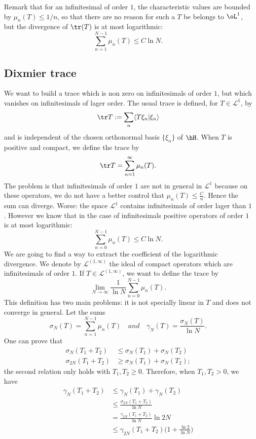 Remark that for an infinitesimal of order $1$, the characteristic values are bounded by $\mu_n(T)\leq 1/n$, so that there are no reason for such a $T$ be belongs to $\oL^1$, but the divergence of $\tr(T)$ is at most logarithmic:
\[
  \sum_{n=1}^{N-1}\mu_n(T)\leq C\ln N.
\]

\subsection{Dixmier trace}

We want to build a trace which is non zero on infinitesimals of order $1$, but which vanishes on infinitesimals of lager order. The usual trace is defined, for $T\in\mathscr{L}^{1}$,  by
\[
  \tr T:=\sum_n\langle T\xi_n|\xi_n\rangle
\]
and is independent of the chosen orthonormal basis $\{ \xi_n \}$ of $\hH$. When $T$ is positive and compact, we define the trace by
\[
  \tr T=\sum_{n=1}^{\infty}\mu_n(T).
\]
The problem is that infinitesimals of order $1$ are not in general in $\mathscr{L}^{1}$ because on these operators, we do not have a better control that $\mu_n(T)\leq \frac{ C }{ n }$. Hence the sum can diverge. Worse: the space $\mathscr{L}^{1}$ contains infinitesimals of order lager than $1$. However we know that in the case of infinitesimals positive operators of order $1$ is at most logarithmic:
\[
  \sum_{n=0}^{N-1}\mu_n(T)\leq C\ln N.
\]
We are going to find a way to extract the coefficient of the logarithmic divergence. We denote by $\mathscr{L}^{(1,\infty)}$ the ideal of compact operators which are infinitesimals of order $1$. If $T\in\mathscr{L}^{(1,\infty)}$, we want to define the trace by
\[
  \lim_{N\to\infty}\frac{1}{ \ln N }\sum_{n=0}^{N-1}\mu_n(T).
\]
This definition has two main problems: it is not specially linear in $T$ and does not converge in general. Let the sums
\[
  \sigma_N(T)=\sum_{n=1}^{N-1}\mu_n(T)\quad{ and }\quad\gamma_N(T)=\frac{ \sigma_N(T) }{ \ln N }.
\]
One can prove that
\begin{subequations}
\begin{align}
\sigma_N(T_1+T_2)&\leq\sigma_N(T_1)+\sigma_N(T_2)\\
\sigma_{2N}(T_1+T_2)&\geq\sigma_N(T_1)+\sigma_N(T_2);
\end{align}
\end{subequations}
the second relation only holds with $T_1,T_2\geq0$. Therefore, when $T_1,T_2>0$, we have
\begin{equation} \label{eq_gammaNleq}
\begin{split}
  \gamma_N(T_1+T_2)&\leq \gamma_N(T_1)+\gamma_N(T_2)\\
		&\leq \frac{ \sigma_{2N}(T_1+T_2) }{ \ln N }\\
		&=\frac{ \gamma_{2N}(T_1+T_2) }{ \ln N }\ln 2N\\
		&\leq \gamma_{2N}(T_1+T_2)\big( 1+\frac{ \ln 2 }{ \ln N } \big)
\end{split}
\end{equation}
